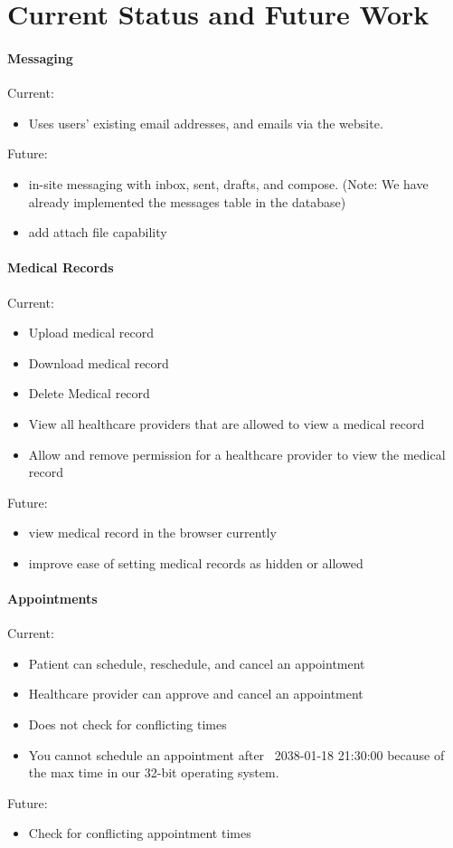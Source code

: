 \chapter{Current Status and Future Work}

\subsubsection{Messaging}
Current: 
\begin{itemize}
\item Uses users' existing email addresses, and emails via the website. 
\end{itemize}
Future: 
\begin{itemize}
\item in-site messaging with inbox, sent, drafts, and compose. (Note: We have already implemented the messages table in the database)
\item add attach file capability
\end{itemize}

\subsubsection{Medical Records}
Current: 
\begin{itemize}
\item Upload medical record
\item Download medical record
\item Delete Medical record
\item View all healthcare providers that are allowed to view a medical record
\item Allow and remove permission for a healthcare provider to view the medical record
\end{itemize}
Future:
\begin{itemize}
\item view medical record in the browser currently 
\item improve ease of setting medical records as hidden or allowed
\end{itemize}

\subsubsection{Appointments}
Current: 
\begin{itemize}
\item Patient can schedule, reschedule, and cancel an appointment
\item Healthcare provider can approve and cancel an appointment
\item Does not check for conflicting times 
\item You cannot schedule an appointment after ~2038-01-18 21:30:00 because of the max time in our 32-bit operating system. 
\end{itemize}
Future: 
\begin{itemize}
\item Check for conflicting appointment times
\end{itemize}


